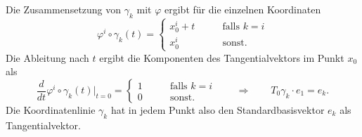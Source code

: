 Die Zusammensetzung von $\gamma_k$ mit $\varphi$ ergibt für die
einzelnen Koordinaten
\[
\varphi^i\circ\gamma_k(t)
=
\begin{cases}
x_0^i+t&\qquad\text{falls $k=i$} \\
x_0^i  &\qquad\text{sonst}.
\end{cases}
\]
Die Ableitung nach $t$ ergibt die Komponenten des Tangentialvektors im
Punkt $x_0$ als
\[
\frac{d}{dt}\varphi^i\circ\gamma_k(t)
\bigg|_{t=0}
=
\begin{cases}
1&\qquad \text{falls $k=i$}\\
0&\qquad\text{sonst.}
\end{cases}
\qquad\Rightarrow\qquad
T_0\gamma_k \cdot e_1 = e_k.
\]
Die Koordinatenlinie $\gamma_k$ hat in jedem Punkt also den
%
Standardbasisvektor $e_k$ als Tangentialvektor.
